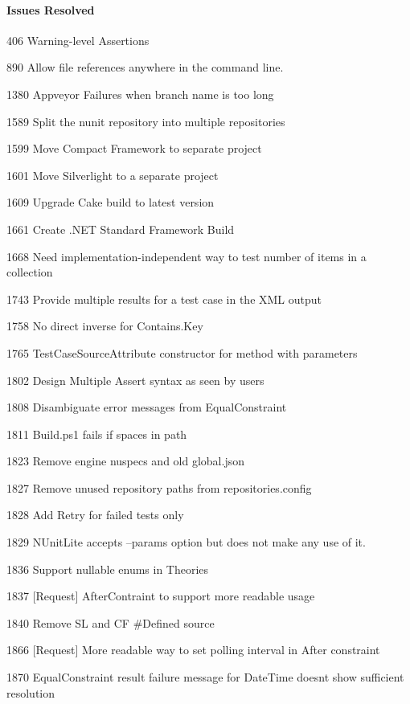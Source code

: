 \paragraph*{Issues Resolved}


\begin{DoxyItemize}
\item 406 Warning-\/level Assertions
\item 890 Allow file references anywhere in the command line.
\item 1380 Appveyor Failures when branch name is too long
\item 1589 Split the nunit repository into multiple repositories
\item 1599 Move Compact Framework to separate project
\item 1601 Move Silverlight to a separate project
\item 1609 Upgrade Cake build to latest version
\item 1661 Create .N\+ET Standard Framework Build
\item 1668 Need implementation-\/independent way to test number of items in a collection
\item 1743 Provide multiple results for a test case in the X\+ML output
\item 1758 No direct inverse for Contains.\+Key
\item 1765 Test\+Case\+Source\+Attribute constructor for method with parameters
\item 1802 Design Multiple Assert syntax as seen by users
\item 1808 Disambiguate error messages from Equal\+Constraint
\item 1811 Build.\+ps1 fails if spaces in path
\item 1823 Remove engine nuspecs and old global.\+json
\item 1827 Remove unused repository paths from repositories.\+config
\item 1828 Add Retry for failed tests only
\item 1829 N\+Unit\+Lite accepts --params option but does not make any use of it.
\item 1836 Support nullable enums in Theories
\item 1837 [Request] After\+Contraint to support more readable usage
\item 1840 Remove SL and CF \#\+Defined source
\item 1866 [Request] More readable way to set polling interval in After constraint
\item 1870 Equal\+Constraint result failure message for Date\+Time doesn\textquotesingle{}t show sufficient resolution

\end{DoxyItemize}
